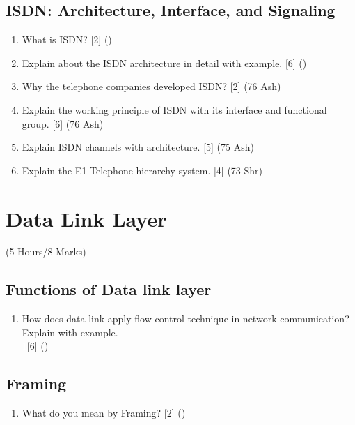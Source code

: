 \documentclass[12pt]{article}
\newcommand{\enter}{\\\textcolor{white}{1}}
\begin{document}
	\subsection{ISDN: Architecture, Interface, and Signaling}
		\begin{enumerate}[noitemsep, topsep=0pt]
			\item What is ISDN? \hfill [2] ()
			
			\item Explain about the ISDN architecture in detail with example. \hfill [6] ()
			
			\item Why the telephone companies developed ISDN? \hfill [2] (76 Ash)
			
			\item Explain the working principle of ISDN with its interface and functional group. \hfill [6] (76 Ash)
			
			\item Explain ISDN channels with architecture. \hfill [5] (75 Ash)
			
			\item Explain the E1 Telephone hierarchy system. \hfill [4] (73 Shr)
		\end{enumerate}

	\pagebreak

\section{Data Link Layer}
	\begin{center}(5 Hours/8 Marks)\end{center}
	\subsection{Functions of Data link layer}
		\begin{enumerate}[noitemsep, topsep=0pt]
			\item How does data link apply flow control technique in network communication? Explain with example.
			\enter\hfill [6] ()
		\end{enumerate}
		
	\subsection{Framing}
		\begin{enumerate}[noitemsep, topsep=0pt]
			\item What do you mean by Framing? \hfill [2] ()
		\end{enumerate}
\end{document}
